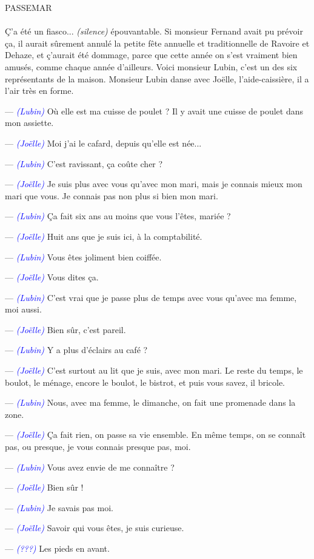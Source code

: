 \documentclass[a4paper]{report}
\newcounter{rem}[chapter]
\newcommand{\annot}[1]{{\footnotesize \textcolor{blue}{\textit{(#1)}}}}
\newcommand{\repl}[2]{\uppercase{#1}\\\\#2\\}
\begin{document}
\repl{Passemar}{Ç'a été un fiasco... \textit{(silence)} épouvantable. Si monsieur Fernand avait pu prévoir ça, il aurait sûrement annulé la petite fête annuelle et traditionnelle de Ravoire et Dehaze, et ç'aurait été dommage, parce que cette année on s'est vraiment bien amusés, comme chaque année d'ailleurs. Voici monsieur Lubin, c'est un des six représentants de la maison. Monsieur Lubin danse avec Joëlle, l'aide-caissière, il a l'air très en forme.

--- \annot{Lubin} Où elle est ma cuisse de poulet ? Il y avait une cuisse de poulet dans mon assiette.

--- \annot{Joëlle} Moi j'ai le cafard, depuis qu'elle est née...

--- \annot{Lubin} C'est ravissant, ça coûte cher ?

--- \annot{Joëlle} Je suis plus avec vous qu'avec mon mari, mais je connais mieux mon mari que vous. Je connais pas non plus si bien mon mari.

--- \annot{Lubin} Ça fait six ans au moins que vous l'êtes, mariée ?

--- \annot{Joëlle} Huit ans que je suis ici, à la comptabilité.

--- \annot{Lubin} Vous êtes joliment bien coiffée.

--- \annot{Joëlle} Vous dites ça.

--- \annot{Lubin} C'est vrai que je passe plus de temps avec vous qu'avec ma femme, moi aussi.

--- \annot{Joëlle} Bien sûr, c'est pareil.

--- \annot{Lubin} Y a plus d'éclairs au café ?

--- \annot{Joëlle} C'est surtout au lit que je suis, avec mon mari. Le reste du temps, le boulot, le ménage, encore le boulot, le bistrot, et puis vous savez, il bricole.

--- \annot{Lubin} Nous, avec ma femme, le dimanche, on fait une promenade dans la zone.

--- \annot{Joëlle} Ça fait rien, on passe sa vie ensemble. En même temps, on se connaît pas, ou presque, je vous connais presque pas, moi.

--- \annot{Lubin} Vous avez envie de me connaître ?

--- \annot{Joëlle} Bien sûr !

--- \annot{Lubin} Je savais pas moi.

--- \annot{Joëlle} Savoir qui vous êtes, je suis curieuse.

--- \annot{???} Les pieds en avant.

}
\end{document}
